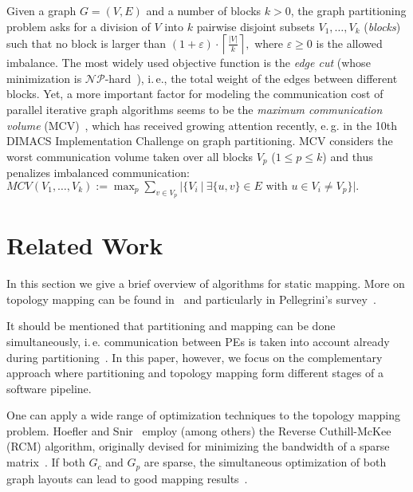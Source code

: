 \documentclass[pdftex]{llncs}
\newcommand{\eg}{e.\,g.\xspace}
\newcommand{\ie}{i.\,e.\xspace}
\begin{document}
Given a graph $G=(V,E)$ and a number of blocks $k > 0$, the 
graph partitioning problem asks for a division of $V$ into $k$ pairwise
disjoint subsets $V_1, \dots, V_k$ (\emph{blocks}) such that no block
is larger than
$(1+\varepsilon)\cdot \left\lceil\frac{|V|}{k}\right\rceil,$
where $\varepsilon \geq 0$ is the allowed imbalance. The most widely
used objective function 
is the \emph{edge cut} (whose minimization is
$\mathcal{NP}$-hard~\cite{Garey:1979:CIG:578533}), \ie, the total weight of the edges between
different blocks.  Yet, a more important factor for modeling the communication cost of parallel 
iterative graph algorithms seems to be the \emph{maximum communication volume} (MCV)~\cite{Hendrickson_graphpartitioning}, 
which has received growing attention recently, \eg in the 10th DIMACS Implementation Challenge
on graph partitioning. 
MCV considers the worst
communication volume taken over all blocks $V_p$ ($1 \leq p \leq k$)
and thus penalizes imbalanced communication:
$MCV(V_1, \dots, V_k) := \max_p \sum_{v \in V_p} |\{ V_i ~|~ \exists \{u, v\} \in E \mbox{ with } u \in V_i  \neq V_p\}|.$


\section{Related Work}
\label{sub:related}
In this section we give a brief overview of algorithms for static
mapping. 
More on topology mapping can be found
in~\cite{Aubanel09resource,6495451} and particularly in Pellegrini's
survey~\cite{Pellegrini11static}.

It should be mentioned that partitioning and mapping can be done
simultaneously, \ie communication between PEs is taken into account
already during
partitioning~\cite{DBLP:journals/fgcs/WalshawC01,HuangAB06pagrid,MoulitsasK08architecture}.
In this paper, however, we focus on the complementary approach where
partitioning and topology mapping form different stages of a software
pipeline.

One can apply a wide range of optimization techniques to the topology
mapping problem. Hoefler and Snir~\cite{hoefler-topomap} employ (among
others) the Reverse Cuthill-McKee (RCM) algorithm, originally devised
for minimizing the bandwidth of a sparse matrix~\cite{Cuthill69a}. If
both $G_c$ and $G_p$ are sparse, the simultaneous optimization of both
graph layouts can lead to good mapping
results~\cite{Pellegrini07scotch}.
\end{document}
